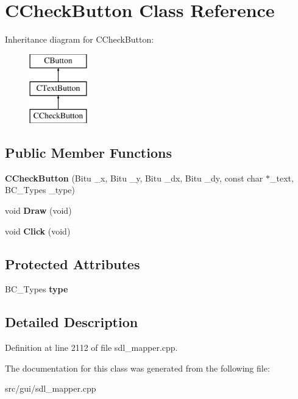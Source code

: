 \hypertarget{classCCheckButton}{\section{C\-Check\-Button Class Reference}
\label{classCCheckButton}
}
Inheritance diagram for C\-Check\-Button\-:\begin{figure}[H]
\begin{center}
\leavevmode
\includegraphics[height=3.000000cm]{classCCheckButton}
\end{center}
\end{figure}
\subsection*{Public Member Functions}
\begin{DoxyCompactItemize}
\item 
\hypertarget{classCCheckButton_a54c679603fea5cb3e04277f6099d2067}{{\bfseries C\-Check\-Button} (Bitu \-\_\-x, Bitu \-\_\-y, Bitu \-\_\-dx, Bitu \-\_\-dy, const char $\ast$\-\_\-text, B\-C\-\_\-\-Types \-\_\-type)}\label{classCCheckButton_a54c679603fea5cb3e04277f6099d2067}

\item 
\hypertarget{classCCheckButton_a1893209408d4822886cd6e39aab69db4}{void {\bfseries Draw} (void)}\label{classCCheckButton_a1893209408d4822886cd6e39aab69db4}

\item 
\hypertarget{classCCheckButton_a5d3d194c8eedc74fbb7862165737833e}{void {\bfseries Click} (void)}\label{classCCheckButton_a5d3d194c8eedc74fbb7862165737833e}

\end{DoxyCompactItemize}
\subsection*{Protected Attributes}
\begin{DoxyCompactItemize}
\item 
\hypertarget{classCCheckButton_a5351f20571c7ed787def47ae73a1820f}{B\-C\-\_\-\-Types {\bfseries type}}\label{classCCheckButton_a5351f20571c7ed787def47ae73a1820f}

\end{DoxyCompactItemize}


\subsection{Detailed Description}


Definition at line 2112 of file sdl\-\_\-mapper.\-cpp.



The documentation for this class was generated from the following file\-:\begin{DoxyCompactItemize}
\item 
src/gui/sdl\-\_\-mapper.\-cpp\end{DoxyCompactItemize}
